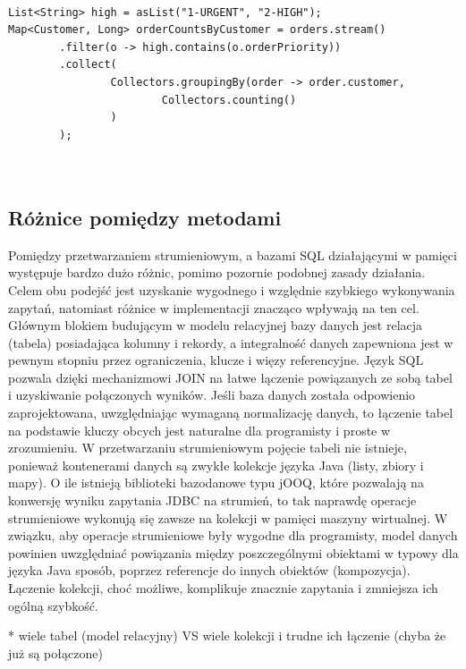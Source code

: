 \documentclass[12pt]{extarticle}
\begin{document}
\begin{lstlisting}[label=testclass, caption=Zaawansowane wykorzystanie Stream API]

List<String> high = asList("1-URGENT", "2-HIGH");
Map<Customer, Long> orderCountsByCustomer = orders.stream()
        .filter(o -> high.contains(o.orderPriority))
        .collect(
                Collectors.groupingBy(order -> order.customer,
                        Collectors.counting()
                )
        );
        
        

\end{lstlisting}

\subsection{Różnice pomiędzy metodami}

    Pomiędzy przetwarzaniem strumieniowym, a bazami SQL działającymi w pamięci występuje bardzo dużo różnic, pomimo pozornie podobnej zasady działania. Celem obu podejść jest uzyskanie wygodnego i względnie szybkiego wykonywania zapytań, natomiast różnice w implementacji znacząco wpływają na ten cel.
    Głównym blokiem budującym w modelu relacyjnej bazy danych jest relacja (tabela) posiadająca kolumny i rekordy, a integralność danych zapewniona jest w pewnym stopniu przez ograniczenia, klucze i więzy referencyjne. Język SQL pozwala dzięki mechanizmowi JOIN na łatwe łączenie powiązanych ze sobą tabel i uzyskiwanie połączonych wyników. Jeśli baza danych została odpowienio zaprojektowana, uwzględniając wymaganą normalizację danych, to łączenie tabel na podstawie kluczy obcych jest naturalne dla programisty i proste w zrozumieniu. W przetwarzaniu strumieniowym pojęcie tabeli nie istnieje, ponieważ kontenerami danych są zwykłe kolekcje języka Java (listy, zbiory i mapy). O ile istnieją biblioteki bazodanowe typu jOOQ, które pozwalają na konwersję wyniku zapytania JDBC na strumień, to tak naprawdę operacje strumieniowe wykonują się zawsze na kolekcji w pamięci maszyny wirtualnej. W związku, aby operacje strumieniowe były wygodne dla programisty, model danych powinien uwzględniać powiązania między poszczególnymi obiektami w typowy dla języka Java sposób, poprzez referencje do innych obiektów (kompozycja). Łączenie kolekcji, choć możliwe, komplikuje znacznie zapytania i zmniejsza ich ogólną szybkość.

* wiele tabel (model relacyjny) VS wiele kolekcji i trudne ich łączenie (chyba że już są połączone)
\end{document}
